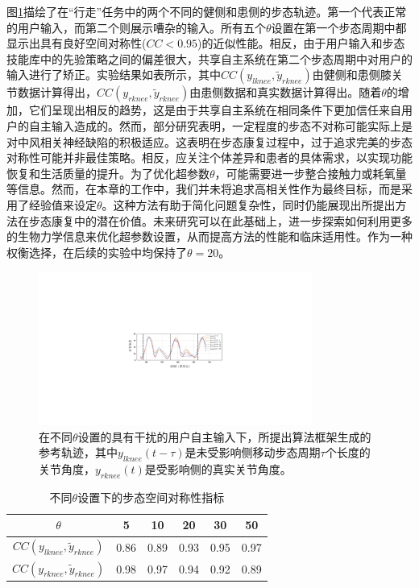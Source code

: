 图\ref{fig:5-5}描绘了在``行走''任务中的两个不同的健侧和患侧的步态轨迹。第一个代表正常的用户输入，而第二个则展示嘈杂的输入。所有五个$\theta$设置在第一个步态周期中都显示出具有良好空间对称性($CC<0.95$)的近似性能。相反，由于用户输入和步态技能库中的先验策略之间的偏差很大，共享自主系统在第二个步态周期中对用户的输入进行了矫正。实验结果如表\uppercase \expandafter{}所示，其中${CC}({y_{lknee}},{\tilde y_{rknee}})$由健侧和患侧膝关节数据计算得出，${CC}({y_{rknee}},{\tilde y_{rknee}})$由患侧数据和真实数据计算得出。随着$\theta $的增加，它们呈现出相反的趋势，这是由于共享自主系统在相同条件下更加信任来自用户的自主输入造成的。然而，部分研究表明，一定程度的步态不对称可能实际上是对中风相关神经缺陷的积极适应。这表明在步态康复过程中，过于追求完美的步态对称性可能并非最佳策略。相反，应关注个体差异和患者的具体需求，以实现功能恢复和生活质量的提升\cite{balabanGaitDisturbancesPatients2014}。为了优化超参数$\theta $，可能需要进一步整合接触力或耗氧量等信息。然而，在本章的工作中，我们并未将追求高相关性作为最终目标，而是采用了经验值来设定$\theta $。这种方法有助于简化问题复杂性，同时仍能展现出所提出方法在步态康复中的潜在价值。未来研究可以在此基础上，进一步探索如何利用更多的生物力学信息来优化超参数设置，从而提高方法的性能和临床适用性。作为一种权衡选择，在后续的实验中均保持了$\theta =20$。
\begin{figure}[htb]
  \centering\includegraphics[width=0.8\textwidth]{figures/5-Fig-5.pdf}
  \caption{在不同$\theta $设置的具有干扰的用户自主输入下，所提出算法框架生成的参考轨迹，其中${y_{lknee}}(t - \tau )$是未受影响侧移动步态周期$\tau $个长度的关节角度，${y_{rknee}}(t)$是受影响侧的真实关节角度。}
  \label{fig:5-5}
\end{figure}

\begin{table}[htb]
  \centering
  \caption{不同$\theta $设置下的步态空间对称性指标}
  \begin{tabular}{cccccc}
  \toprule
          $\theta $         & 5 & 10 & 20 & 30 & 50  \\ 
  \midrule
          ${CC}({y_{lknee}},{\tilde y_{rknee}})$         & 0.86	&0.89	&0.93	&0.95	&0.97  \\ 
          ${CC}({y_{rknee}},{\tilde y_{rknee}})$         & 0.98 &0.97	&0.94	&0.92	&0.89  \\ 
  \bottomrule
  \end{tabular}
  \label{tab:5-1} 
\end{table}   

